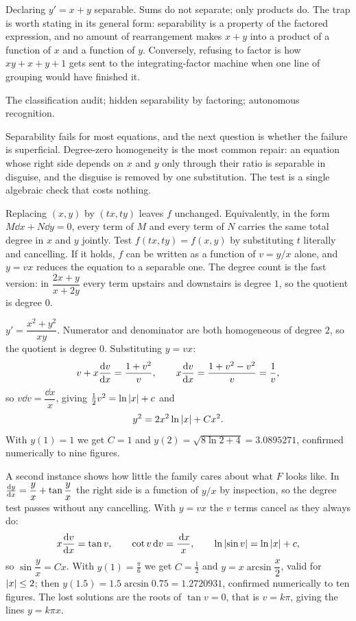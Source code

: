 \begin{trap}
Declaring $y'=x+y$ separable. Sums do not separate; only products do. The trap is worth stating in its general form: separability is a property of the factored expression, and no amount of rearrangement makes $x+y$ into a product of a function of $x$ and a function of $y$. Conversely, refusing to factor is how $xy+x+y+1$ gets sent to the integrating-factor machine when one line of grouping would have finished it.
\end{trap}

\begin{seealsob}The classification audit; hidden separability by factoring; autonomous recognition.\end{seealsob}

Separability fails for most equations, and the next question is whether the failure is superficial. Degree-zero homogeneity is the most common repair: an equation whose right side depends on $x$ and $y$ only through their ratio is separable in disguise, and the disguise is removed by one substitution. The test is a single algebraic check that costs nothing.

\cue Replacing $(x,y)$ by $(tx,ty)$ leaves $f$ unchanged. Equivalently, in the form $M\dd x+N\dd y=0$, every term of $M$ and every term of $N$ carries the same total degree in $x$ and $y$ jointly.
\method Test $f(tx,ty)=f(x,y)$ by substituting $t$ literally and cancelling. If it holds, $f$ can be written as a function of $v=y/x$ alone, and $y=vx$ reduces the equation to a separable one. The degree count is the fast version: in $\dfrac{2x+y}{x+2y}$ every term upstairs and downstairs is degree $1$, so the quotient is degree $0$.

\begin{worked}
$y'=\dfrac{x^{2}+y^{2}}{xy}$. Numerator and denominator are both homogeneous of degree $2$, so the quotient is degree $0$. Substituting $y=vx$:
\[v+x\frac{\mathrm{d}v}{\mathrm{d}x}=\frac{1+v^{2}}{v},\qquad x\frac{\mathrm{d}v}{\mathrm{d}x}=\frac{1+v^{2}-v^{2}}{v}=\frac1v,\]
so $v\dd v=\dfrac{\dd x}{x}$, giving $\tfrac12v^{2}=\ln\left\lvert x\right\rvert+c$ and
\[y^{2}=2x^{2}\ln\left\lvert x\right\rvert+Cx^{2}.\]
With $y(1)=1$ we get $C=1$ and $y(2)=\sqrt{8\ln2+4}=3.0895271$, confirmed numerically to nine figures.
\end{worked}

A second instance shows how little the family cares about what $F$ looks like. In $\frac{\mathrm{d}y}{\mathrm{d}x}=\dfrac yx+\tan\dfrac yx$ the right side is a function of $y/x$ by inspection, so the degree test passes without any cancelling. With $y=vx$ the $v$ terms cancel as they always do:
\[x\frac{\mathrm{d}v}{\mathrm{d}x}=\tan v,\qquad \cot v\,\mathrm{d} v=\frac{\,\mathrm{d} x}{x},\qquad \ln\left\lvert \sin v\right\rvert=\ln\left\lvert x\right\rvert+c,\]
so $\sin\dfrac yx=Cx$. With $y(1)=\tfrac{\pi}{6}$ we get $C=\tfrac12$ and $y=x\arcsin\dfrac x2$, valid for $\left\lvert x\right\rvert\leq2$; then $y(1.5)=1.5\arcsin0.75=1.2720931$, confirmed numerically to ten figures. The lost solutions are the roots of $\tan v=0$, that is $v=k\pi$, giving the lines $y=k\pi x$.

